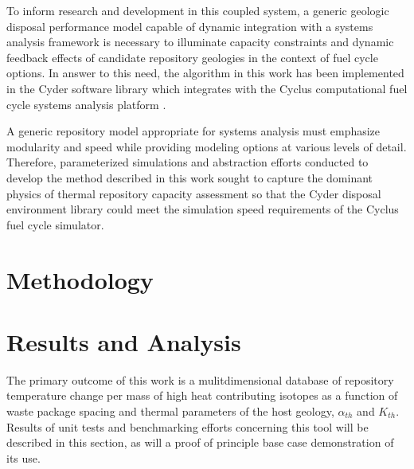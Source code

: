 \documentclass{anstrans}
\begin{document}
To inform research and development in this coupled system, a generic geologic disposal 
performance model capable of dynamic integration with a systems analysis 
framework is necessary to illuminate capacity constraints and dynamic feedback 
effects of candidate repository geologies in the context of fuel cycle options.
In answer to this need, the algorithm in this work has been implemented in the 
Cyder software library which integrates with the Cyclus computational 
fuel cycle systems analysis platform \cite{huff_cyder_2012,huff_cyclus:_2010}. 

A generic repository model appropriate for systems analysis must emphasize 
modularity and speed while providing modeling options at various levels of 
detail. Therefore, parameterized simulations and abstraction efforts conducted to develop 
the method described in this work sought to capture the dominant physics of 
thermal repository capacity assessment so that the Cyder disposal environment 
library could meet the simulation speed requirements of the Cyclus fuel cycle 
simulator.

\section{Methodology}










\section{Results and Analysis}

The primary outcome of this work is a mulitdimensional database of repository temperature 
change per mass of high heat contributing isotopes as a function of waste
package spacing and thermal parameters of the host geology, $\alpha_{th}$ and $K_{th}$. 
Results of unit tests and benchmarking efforts concerning this tool will be described in this 
section, as will a proof of principle base case demonstration of its use. 
\end{document}
